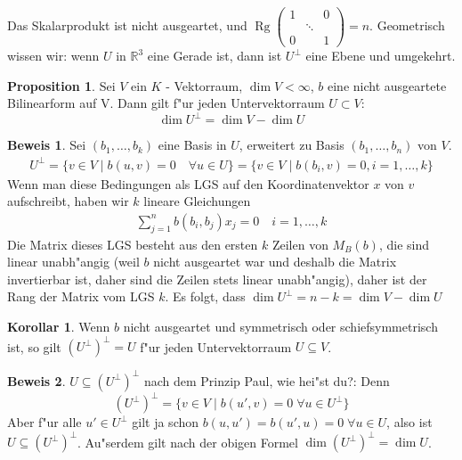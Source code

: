 \documentclass[oneside,fontsize=11pt,paper=a4,BCOR=0mm,DIV=12,automark,headsepline]{scrbook}
\newcommand{\gq}[1]{\glqq{}#1\grqq{}} %
\DeclareMathOperator{\mRg}{Rg}
\theoremstyle{remark}
\theoremstyle{definition}
\newtheorem*{proposition}{Proposition}
\newtheorem*{korollar}{Korollar}
\theoremstyle{definition}
\newtheorem*{prof}{Beweis}
\theoremstyle{remark}
\begin{document}
\begin{exa}
  Das Skalarprodukt ist nicht ausgeartet, und \(\mRg
  \begin{pmatrix}
    1 & & 0 \\
    & \ddots & \\
    0 & & 1
  \end{pmatrix}
 = n\). Geometrisch wissen wir: wenn $U$ in
  $\mathbb{R}^3$ eine Gerade ist, dann ist \(U^\perp\) eine Ebene und umgekehrt.
\end{exa}

\begin{proposition}
  Sei $V$ ein $K$ - Vektorraum, \(\dim V < \infty\), $b$ eine nicht ausgeartete Bilinearform auf V.
  Dann gilt f"ur jeden Untervektorraum \(U\subset V\):
  \[\dim U^\perp = \dim V - \dim U\]
\end{proposition}
\begin{prof}
  Sei \((b_1, \dots, b_k)\) eine Basis in \(U\), erweitert zu Basis \((b_1,\dots, b_n)\) von \(V\).
  \begin{align*}
    U^\perp = \{v\in V \mid b(u, v) = 0\quad \forall u\in U\} = \{v\in V\mid b(b_i, v) = 0, i=1,\dots, k\}
  \end{align*}
  Wenn man diese Bedingungen als LGS auf den Koordinatenvektor \(x\) von \(v\) aufschreibt, haben wir \(k\) lineare Gleichungen
  \begin{align*}
    \sum_{j=1}^nb(b_i, b_j)x_j = 0\quad i = 1,\dots, k
  \end{align*}
  Die Matrix dieses LGS besteht aus den ersten \(k\) Zeilen von \(M_B(b)\), die sind linear unabh"angig (weil \(b\) nicht ausgeartet war und deshalb die Matrix invertierbar ist, daher sind die Zeilen stets linear unabh"angig), daher ist der Rang der Matrix vom LGS \(k\). Es folgt, dass \(\dim U^\perp = n - k = \dim V - \dim U\)
\end{prof}
\begin{korollar}
  Wenn $b$ nicht ausgeartet und symmetrisch oder schiefsymmetrisch ist, so gilt
  $(U^\perp)^\perp = U$ f"ur jeden Untervektorraum $U\subseteq V$.
\end{korollar}
\begin{prof}
  \(U\subseteq (U^\perp)^\perp\) nach dem Prinzip \gq{Paul, wie hei"st du?}: Denn \[(U^\perp)^\perp = \{v\in V \mid b(u', v) = 0\;\forall u\in U^\perp\}\] Aber f"ur alle \(u'\in U^\perp\) gilt ja schon \(b(u, u') = b(u', u) = 0\;\forall u\in U\), also ist \(U\subseteq (U^\perp)^\perp\). Au"serdem gilt nach der obigen Formel \(\dim (U^\perp)^\perp = \dim U\).
\end{prof}
\end{document}
